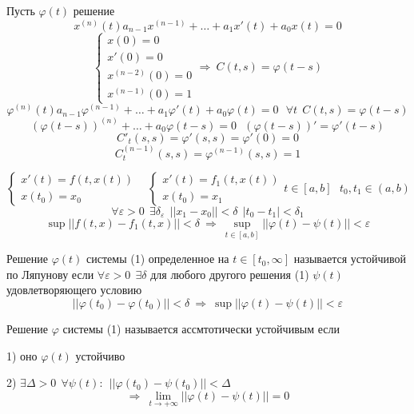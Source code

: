 \begin{block}[Предложение]
  Пусть $\varphi(t)$ решение
  $$
  x^{(n)}(t) a_{n-1}x^{(n-1)} + \ldots + a_1 x'(t) + a_0 x(t) = 0
  $$
  $$
  \left\{
  \begin{array}{l}
    x(0) = 0 \\
    x'(0) = 0 \\
    x^{(n-2)}(0) = 0 \\
    x^{(n-1)}(0) = 1
  \end{array}
  \right.
  \Rightarrow ~ C(t,s) = \varphi(t-s)
  $$
  $$
  \varphi^{(n)}(t) a_{n-1}\varphi^{(n-1)} + \ldots + a_1 \varphi'(t) + a_0
  \varphi(t) = 0 ~~~ \forall t ~~ C(t,s) = \varphi(t-s)
  $$
  $$
  (\varphi(t-s))^{(n)} + \ldots + a_0 \varphi(t-s) = 0
  ~~~
  (\varphi(t-s))' = \varphi'(t-s)
  $$
  $$
  C'_t(s,s) =  \varphi'(s,s) = \varphi'(0) = 0
  $$
  $$
  C^{(n-1)}_t(s,s) = \varphi^{(n-1)}(s,s) = 1
  $$
\end{block}

\begin{define}
  $$
  \left\{
  \begin{array}{l}
    x'(t) = f(t, x(t)) \\
    x(t_0) = x_0
  \end{array}
  \right.
  ~~~~
  \left\{
  \begin{array}{l}
    x'(t) = f_1(t, x(t)) \\
    x(t_0) = x_1
  \end{array}
  \right.
  t \in [a,b] ~~~ t_0, t_1 \in (a,b)
  $$
  $$
  \forall \varepsilon > 0 ~~ \exists \delta_{\varepsilon} ~~ ||x_1 - x_0||
  < \delta ~~ |t_0 - t_1| < \delta_1
  $$
  $$
  \sup ||f(t,x) - f_1(t,x)|| < \delta
  ~ \Rightarrow ~ \sup_{t \in [a,b]} ||\varphi(t) - \psi(t)|| < \varepsilon
  $$
\end{define}

\begin{define}
  Решение $\varphi(t)$ системы (1) определенное на $t \in [t_0, \infty]$
  называется устойчивой по Ляпунову если $\forall \varepsilon > 0 ~~ \exists
  \delta$ для любого другого решения (1) $\psi(t)$ удовлетворяющего условию
  $$
  ||\varphi(t_0) - \varphi(t_0)|| < \delta ~ \Rightarrow ~ \sup||\varphi(t) -
  \psi(t)|| < \varepsilon
  $$
\end{define}

\begin{define}
  Решение $\varphi$ системы (1) называется ассмтотически устойчивым если

  1) оно $\varphi(t)$ устойчиво

  2) $\exists \Delta > 0 ~~ \forall \psi(t): ~~ || \varphi(t_0) - \psi(t_0)||
  < \Delta$
  $$
  \Rightarrow ~ \lim_{t \to +\infty} ||\varphi(t) - \psi(t)|| = 0
  $$
\end{define}


